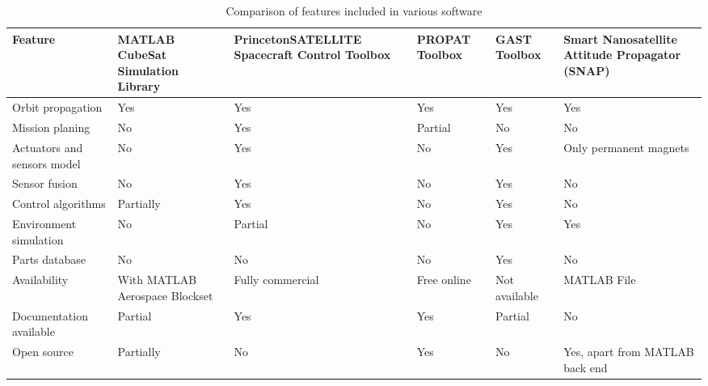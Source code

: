 \begin{table}[H]
{{\begin{tabular}{C{2.5cm} | C{3cm} C{3cm} C{3cm} C{3cm} C{3cm} }
                            \textbf{Feature}            & \textbf{MATLAB CubeSat Simulation Library} & \textbf{PrincetonSATELLITE Spacecraft Control Toolbox} & \textbf{PROPAT Toolbox} & \textbf{GAST Toolbox}  & \textbf{Smart Nanosatellite Attitude Propagator (SNAP)}  \\
            \hline 
                            Orbit propagation           & Yes                               & Yes                                           & Yes            & Yes           & Yes                                             \\
                            Mission planing             & No                                & Yes                                           & Partial        & No            & No                                              \\
                            Actuators and sensors model & No                                & Yes                                           & No             & Yes           & Only permanent magnets                          \\
                            Sensor fusion               & No                                & Yes                                           & No             & Yes           & No                                              \\
                            Control algorithms          & Partially                          & Yes                                           & No             & Yes           & No                                              \\
                            Environment simulation      & No                                & Partial                                       & No             & Yes           & Yes                                             \\
                            Parts database              & No                                & No                                            & No             & Yes           & No                                              \\
                            Availability                & {\small With MATLAB Aerospace Blockset}    & Fully commercial                              & Free online    & Not available & MATLAB File                                     \\
                            Documentation available     & Partial                           & Yes                                           & Yes            & Partial       & No                                              \\
                            Open source                 & Partially                         & No                                            & Yes            & No            & {\small Yes, apart from MATLAB back end}                 \\
                        \end{tabular}}}
                        \caption{Comparison of features included in various software}\label{table:features}
                    \end{table}
